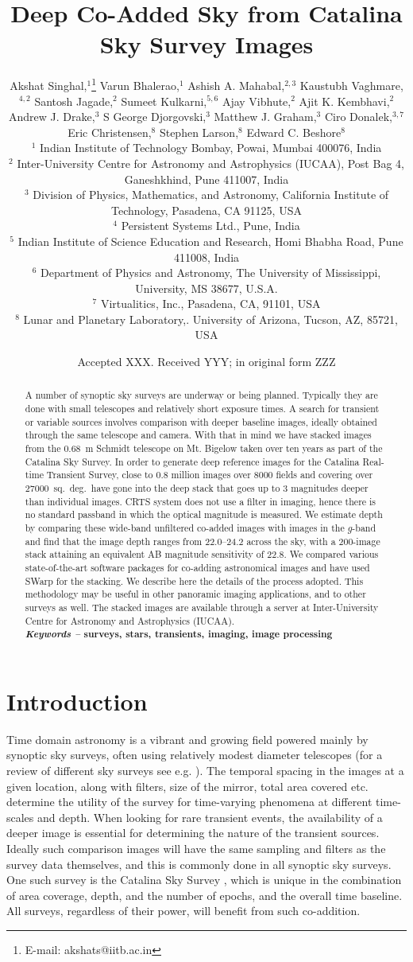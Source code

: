 \documentclass[fleqn,usenatbib]{mnras}
\title{Deep Co-Added Sky from Catalina Sky Survey Images}
\author[A Singhal et al.]{Akshat Singhal,$^{1}$\thanks{E-mail: akshats@iitb.ac.in} 
Varun Bhalerao,$^{1}$
Ashish A. Mahabal,$^{2,3}$
Kaustubh Vaghmare,$^{4,2}$
\newauthor
Santosh Jagade,$^{2}$ 
Sumeet Kulkarni,$^{5,6}$ 
Ajay Vibhute,$^{2}$ 
Ajit K. Kembhavi,$^{2}$ 
\newauthor
Andrew J. Drake,$^{3}$ S George Djorgovski,$^{3}$ Matthew J. Graham,$^{3}$ Ciro Donalek,$^{3,7}$
\newauthor
Eric Christensen,$^{8}$ Stephen Larson,$^{8}$ Edward C. Beshore$^{8}$
  \\
$^{1}$ Indian Institute of Technology Bombay, Powai, Mumbai 400076, India\\
$^{2}$ Inter-University Centre for Astronomy and Astrophysics (IUCAA), Post Bag 4, Ganeshkhind, Pune 411007, India\\
$^{3}$ Division of Physics, Mathematics, and Astronomy, California Institute of Technology, Pasadena, CA 91125, USA\\
$^{4}$ Persistent Systems Ltd., Pune, India \\
$^{5}$ Indian Institute of Science Education and Research, Homi Bhabha Road, Pune 411008, India\\
$^{6}$ Department of Physics and Astronomy, The University of Mississippi, University, MS 38677, U.S.A.\\
$^{7}$ Virtualitics, Inc., Pasadena, CA, 91101, USA\\
$^{8}$ Lunar and Planetary Laboratory,. University of Arizona, Tucson, AZ, 85721, USA\\
}
\date{Accepted XXX. Received YYY; in original form ZZZ}
\newcommand{\sqd}{sq.~deg.}
\begin{document}
\label{firstpage}

\maketitle
\begin{abstract}
A number of synoptic sky surveys are underway or being planned. Typically they are done with small telescopes and relatively short exposure times. A search for transient or variable sources involves comparison with deeper baseline images, ideally obtained through the same telescope and camera.  With that in mind we have stacked images from the 0.68~m Schmidt telescope on Mt. Bigelow  taken over ten years as part of the Catalina Sky Survey. In order to generate deep reference images for the Catalina Real-time Transient Survey,
close to 0.8 million images over 8000 fields and covering over 27000~\sqd\ have gone into the deep stack that goes up to 3 magnitudes deeper than individual images. CRTS system does not use a filter in imaging, hence there is no standard passband in which the optical magnitude is measured. We estimate depth by comparing these wide-band unfiltered co-added images with images in the $g$-band and find that the image depth ranges from 22.0--24.2 across the sky, with a 200-image stack attaining an equivalent AB magnitude sensitivity of 22.8. 
We compared various state-of-the-art software packages for co-adding astronomical images and have used SWarp for the stacking. We describe here the details of the process adopted. This methodology may be useful in other panoramic imaging applications, and to other surveys as well. The stacked images are available through a server at  Inter-University Centre for Astronomy and Astrophysics (IUCAA).  \\
\textbf{\textit{Keywords -- } surveys, stars, transients, imaging, image processing }
\end{abstract}




\section{Introduction}
Time domain astronomy is a vibrant and growing field powered mainly by synoptic sky surveys, often using relatively modest diameter telescopes (for a review of different sky surveys see e.g. \citet{djorgovski2012}). The temporal spacing in the images at a given location, along with filters, size of the mirror, total area covered etc. determine the utility of the survey for time-varying phenomena at different time-scales and depth. When looking for rare transient events, the availability of a deeper image is essential for determining the nature of the transient sources.
Ideally such comparison images will have the same sampling and filters as the survey data themselves, and this is commonly done in all synoptic sky surveys. One such survey  is the Catalina Sky Survey
\citep{Larson1998, Larson2001},
which is unique in the combination of area coverage, depth, and the number of epochs, and the overall time baseline.
All surveys, regardless of their power, will benefit from such co-addition.
\end{document}
